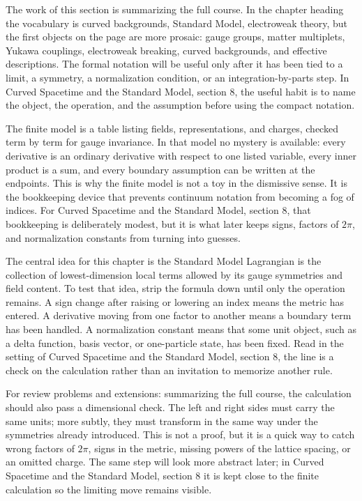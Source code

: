 The work of this section is summarizing the full course.  In the chapter heading the vocabulary is curved backgrounds, Standard Model, electroweak theory, but the first objects on the page are more prosaic: gauge groups, matter multiplets, Yukawa couplings, electroweak breaking, curved backgrounds, and effective descriptions.  The formal notation will be useful only after it has been tied to a limit, a symmetry, a normalization condition, or an integration-by-parts step.  In Curved Spacetime and the Standard Model, section 8, the useful habit is to name the object, the operation, and the assumption before using the compact notation.

The finite model is a table listing fields, representations, and charges, checked term by term for gauge invariance.  In that model no mystery is available: every derivative is an ordinary derivative with respect to one listed variable, every inner product is a sum, and every boundary assumption can be written at the endpoints.  This is why the finite model is not a toy in the dismissive sense.  It is the bookkeeping device that prevents continuum notation from becoming a fog of indices.  For Curved Spacetime and the Standard Model, section 8, that bookkeeping is deliberately modest, but it is what later keeps signs, factors of \(2\pi\), and normalization constants from turning into guesses.

The central idea for this chapter is the Standard Model Lagrangian is the collection of lowest-dimension local terms allowed by its gauge symmetries and field content.  To test that idea, strip the formula down until only the operation remains.  A sign change after raising or lowering an index means the metric has entered.  A derivative moving from one factor to another means a boundary term has been handled.  A normalization constant means that some unit object, such as a delta function, basis vector, or one-particle state, has been fixed.  Read in the setting of Curved Spacetime and the Standard Model, section 8, the line is a check on the calculation rather than an invitation to memorize another rule.

For review problems and extensions: summarizing the full course, the calculation should also pass a dimensional check.  The left and right sides must carry the same units; more subtly, they must transform in the same way under the symmetries already introduced.  This is not a proof, but it is a quick way to catch wrong factors of \(2\pi\), signs in the metric, missing powers of the lattice spacing, or an omitted charge.  The same step will look more abstract later; in Curved Spacetime and the Standard Model, section 8 it is kept close to the finite calculation so the limiting move remains visible.

